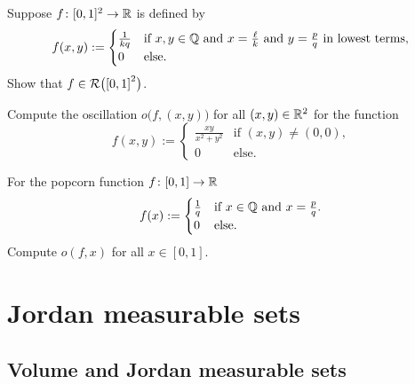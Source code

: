 \begin{exercise}
Suppose 
$f \colon [0,1]^2 \to {\mathbb{R}}$ is defined by
\begin{equation*}
f(x,y) :=
\begin{cases}
\frac{1}{kq} & \text{if $x,y \in {\mathbb{Q}}$ and $x = \frac{\ell}{k}$ and
$y=\frac{p}{q}$ in lowest terms,} \\
0 & \text{else.}
\end{cases}
\end{equation*}
Show that $f \in {\mathcal{R}}\bigl({[0,1]}^2\bigr)$.
\end{exercise}

\begin{exercise}
Compute the oscillation $o\bigl(f,(x,y)\bigr)$ for all $(x,y) \in {\mathbb{R}}^2$
for the function
\begin{equation*}
f(x,y) :=
\begin{cases}
\frac{xy}{x^2+y^2} & \text{if $(x,y) \not= (0,0)$,} \\
0 & \text{else.}
\end{cases}
\end{equation*}
\end{exercise}

\begin{exercise}
For the popcorn function $f \colon [0,1] \to {\mathbb{R}}$
\begin{equation*}
f(x) :=
\begin{cases}
\frac{1}{q} & \text{if $x \in {\mathbb{Q}}$ and $x = \frac{p}{q}$.} \\
0 & \text{else.}
\end{cases}
\end{equation*}
Compute $o(f,x)$ for all $x \in [0,1]$.
\end{exercise}



\sectionnewpage
\section{Jordan measurable sets}
\label{sec:jordansets}


\subsection{Volume and Jordan measurable sets}

